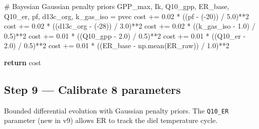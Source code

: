 \documentclass[
  letterpaper,
  DIV=11,
  numbers=noendperiod]{scrartcl}
\newenvironment{Shaded}{\begin{snugshade}}{\end{snugshade}}
\newcommand{\CommentTok}[1]{\textcolor[rgb]{0.37,0.37,0.37}{#1}}
\newcommand{\ControlFlowTok}[1]{\textcolor[rgb]{0.00,0.23,0.31}{\textbf{#1}}}
\newcommand{\DecValTok}[1]{\textcolor[rgb]{0.68,0.00,0.00}{#1}}
\newcommand{\FloatTok}[1]{\textcolor[rgb]{0.68,0.00,0.00}{#1}}
\newcommand{\NormalTok}[1]{\textcolor[rgb]{0.00,0.23,0.31}{#1}}
\newcommand{\OperatorTok}[1]{\textcolor[rgb]{0.37,0.37,0.37}{#1}}
\begin{document}
\begin{Shaded}
\begin{Highlighting}[]
    \CommentTok{\# Bayesian Gaussian penalty priors}
\NormalTok{    GPP\_max, Ik, Q10\_gpp, ER\_base, Q10\_er, pf, d13c\_org, k\_gas\_iso }\OperatorTok{=}\NormalTok{ pvec}
\NormalTok{    cost }\OperatorTok{+=} \FloatTok{0.02} \OperatorTok{*}\NormalTok{ ((pf        }\OperatorTok{{-}}\NormalTok{ (}\OperatorTok{{-}}\DecValTok{20}\NormalTok{)) }\OperatorTok{/} \FloatTok{5.0}\NormalTok{)}\OperatorTok{**}\DecValTok{2}
\NormalTok{    cost }\OperatorTok{+=} \FloatTok{0.02} \OperatorTok{*}\NormalTok{ ((d13c\_org  }\OperatorTok{{-}}\NormalTok{ (}\OperatorTok{{-}}\DecValTok{28}\NormalTok{)) }\OperatorTok{/} \FloatTok{3.0}\NormalTok{)}\OperatorTok{**}\DecValTok{2}
\NormalTok{    cost }\OperatorTok{+=} \FloatTok{0.02} \OperatorTok{*}\NormalTok{ ((k\_gas\_iso }\OperatorTok{{-}} \FloatTok{1.0}\NormalTok{)   }\OperatorTok{/} \FloatTok{0.5}\NormalTok{)}\OperatorTok{**}\DecValTok{2}
\NormalTok{    cost }\OperatorTok{+=} \FloatTok{0.01} \OperatorTok{*}\NormalTok{ ((Q10\_gpp   }\OperatorTok{{-}} \FloatTok{2.0}\NormalTok{)   }\OperatorTok{/} \FloatTok{0.5}\NormalTok{)}\OperatorTok{**}\DecValTok{2}
\NormalTok{    cost }\OperatorTok{+=} \FloatTok{0.01} \OperatorTok{*}\NormalTok{ ((Q10\_er    }\OperatorTok{{-}} \FloatTok{2.0}\NormalTok{)   }\OperatorTok{/} \FloatTok{0.5}\NormalTok{)}\OperatorTok{**}\DecValTok{2}
\NormalTok{    cost }\OperatorTok{+=} \FloatTok{0.01} \OperatorTok{*}\NormalTok{ ((ER\_base   }\OperatorTok{{-}}\NormalTok{ np.mean(ER\_raw)) }\OperatorTok{/} \FloatTok{1.0}\NormalTok{)}\OperatorTok{**}\DecValTok{2}

    \ControlFlowTok{return}\NormalTok{ cost}
\end{Highlighting}
\end{Shaded}

\subsection{Step 9 --- Calibrate 8
parameters}\label{step-9-calibrate-8-parameters}

Bounded differential evolution with Gaussian penalty priors. The
\texttt{Q10\_ER} parameter (new in v9) allows ER to track the diel
temperature cycle.
\end{document}
